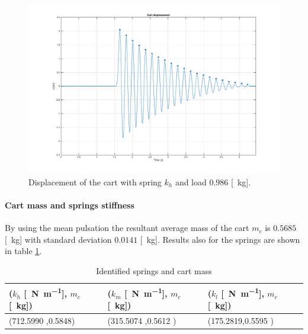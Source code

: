\begin{figure}[!h]
    \centering
    \includegraphics[width=1\textwidth]{img/cart_detached_1.png}
    \caption{Displacement of the cart with spring $k_h$ and load $0.986$ [\SI{}{\kilo \gram}].}
    \label{fig:cart_detached_figure}
\end{figure}
\paragraph{Cart mass and springs stiffness}
By using  the mean pulsation the resultant average mass of the cart $m_c$ is $0.5685$ [\SI{}{\kilo\gram}] with standard deviation $  0.0141$ [\SI{}{\kilo \gram}]. Results also for the springs are shown in table \ref{table: cart_springs_mass}.
\begin{table}[!h]
\centering
\label{table: cart_springs_mass}
\begin{tabular}{|l|l|l|}
\hline
{\textbf{($k_h$ [\SI{}{\newton \per \metre}], $m_c$ [\SI{}{\kilo \gram}])}} & \textbf{($k_m$ [\SI{}{\newton \per \metre}], $m_c$ [\SI{}{\kilo \gram}])} & \textbf{($k_l$ [\SI{}{\newton \per \metre}], $m_c$ [\SI{}{\kilo \gram}])} \\ \hline
(712.5990 ,0.5848)              & (315.5074 ,0.5612 )     & (175.2819,0.5595 )     \\ \hline
\end{tabular}
\caption{Identified springs and cart mass}
\end{table}

